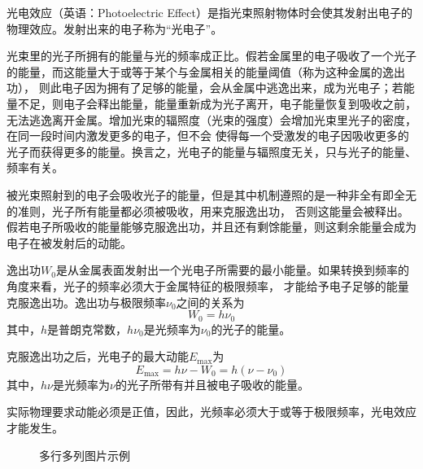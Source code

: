 \documentclass[dvipsnames, svgnames,a4paper,11pt]{article}
\begin{document}
光电效应（英语：Photoelectric Effect）是指光束照射物体时会使其发射出电子的物理效应。发射出来的电子称为“光电子”。

光束里的光子所拥有的能量与光的频率成正比。假若金属里的电子吸收了一个光子的能量，而这能量大于或等于某个与金属相关的能量阈值（称为这种金属的逸出功），
则此电子因为拥有了足够的能量，会从金属中逃逸出来，成为光电子；若能量不足，则电子会释出能量，能量重新成为光子离开，电子能量恢复到吸收之前，
无法逃逸离开金属。增加光束的辐照度（光束的强度）会增加光束里光子的密度，在同一段时间内激发更多的电子，但不会
使得每一个受激发的电子因吸收更多的光子而获得更多的能量。换言之，光电子的能量与辐照度无关，只与光子的能量、频率有关。

被光束照射到的电子会吸收光子的能量，但是其中机制遵照的是一种非全有即全无的准则，光子所有能量都必须被吸收，用来克服逸出功，
否则这能量会被释出。假若电子所吸收的能量能够克服逸出功，并且还有剩馀能量，则这剩余能量会成为电子在被发射后的动能。

逸出功$W_0$是从金属表面发射出一个光电子所需要的最小能量。如果转换到频率的角度来看，光子的频率必须大于金属特征的极限频率，
才能给予电子足够的能量克服逸出功。逸出功与极限频率$\nu_0$之间的关系为
\begin{equation}
	W_0 = h\nu_0
\end{equation}
其中，$h$是普朗克常数，$h\nu_0$是光频率为$\nu_0$的光子的能量。

克服逸出功之后，光电子的最大动能$E_{\max}$为
\begin{equation}
	E_{\max} = h\nu - W_0 = h(\nu-\nu_0)
\end{equation}
其中，$h\nu$是光频率为$\nu$的光子所带有并且被电子吸收的能量。

实际物理要求动能必须是正值，因此，光频率必须大于或等于极限频率，光电效应才能发生。
\begin{figure}[htbp]
	\centering

	\caption{多行多列图片示例}
\end{figure}
\end{document}
